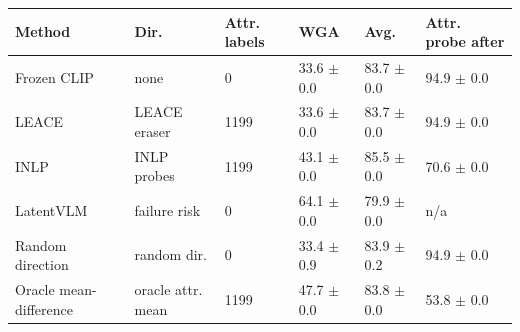 \begin{tabular}{llllll}
\toprule
Method & Dir. & Attr. labels & WGA & Avg. & Attr. probe after \\
\midrule
Frozen CLIP & none & 0 & 33.6 $\pm$ 0.0 & 83.7 $\pm$ 0.0 & 94.9 $\pm$ 0.0 \\
LEACE & LEACE eraser & 1199 & 33.6 $\pm$ 0.0 & 83.7 $\pm$ 0.0 & 94.9 $\pm$ 0.0 \\
INLP & INLP probes & 1199 & 43.1 $\pm$ 0.0 & 85.5 $\pm$ 0.0 & 70.6 $\pm$ 0.0 \\
LatentVLM & failure risk & 0 & 64.1 $\pm$ 0.0 & 79.9 $\pm$ 0.0 & n/a \\
Random direction & random dir. & 0 & 33.4 $\pm$ 0.9 & 83.9 $\pm$ 0.2 & 94.9 $\pm$ 0.0 \\
Oracle mean-difference & oracle attr. mean & 1199 & 47.7 $\pm$ 0.0 & 83.8 $\pm$ 0.0 & 53.8 $\pm$ 0.0 \\
\bottomrule
\end{tabular}
